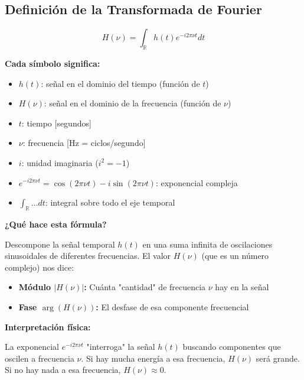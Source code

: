 \documentclass[11pt,a4paper]{article}
\begin{document}
\subsection{Definición de la Transformada de Fourier}

\begin{tcolorbox}[colback=verdeclaro!20,colframe=azuloscuro,title=\textbf{Transformada de Fourier Directa}]
$$\boxed{H(\nu) = \int_{\mathbb{R}} h(t)e^{-i2\pi\nu t}dt}$$

\textbf{Cada símbolo significa:}
\begin{itemize}
\item $h(t)$: señal en el dominio del tiempo (función de $t$)
\item $H(\nu)$: señal en el dominio de la frecuencia (función de $\nu$)
\item $t$: tiempo [segundos]
\item $\nu$: frecuencia [Hz = ciclos/segundo]
\item $i$: unidad imaginaria ($i^2 = -1$)
\item $e^{-i2\pi\nu t} = \cos(2\pi\nu t) - i\sin(2\pi\nu t)$: exponencial compleja
\item $\int_{\mathbb{R}} \ldots dt$: integral sobre todo el eje temporal
\end{itemize}

\textbf{¿Qué hace esta fórmula?}

Descompone la señal temporal $h(t)$ en una suma infinita de oscilaciones sinusoidales de diferentes frecuencias. El valor $H(\nu)$ (que es un número complejo) nos dice:
\begin{itemize}
\item \textbf{Módulo $|H(\nu)|$:} Cuánta "cantidad" de frecuencia $\nu$ hay en la señal
\item \textbf{Fase $\arg(H(\nu))$:} El desfase de esa componente frecuencial
\end{itemize}

\textbf{Interpretación física:}

La exponencial $e^{-i2\pi\nu t}$ "interroga" la señal $h(t)$ buscando componentes que oscilen a frecuencia $\nu$. Si hay mucha energía a esa frecuencia, $H(\nu)$ será grande. Si no hay nada a esa frecuencia, $H(\nu) \approx 0$.
\end{tcolorbox}
\end{document}
